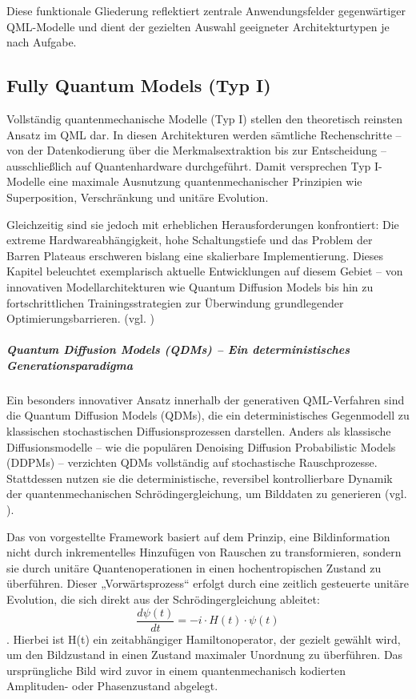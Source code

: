 Diese funktionale Gliederung reflektiert zentrale Anwendungsfelder gegenwärtiger QML-Modelle und dient der gezielten Auswahl geeigneter Architekturtypen je nach Aufgabe.


\subsection{Fully Quantum Models (Typ I)}


Vollständig quantenmechanische Modelle (Typ I) stellen den theoretisch reinsten Ansatz im QML dar. In diesen Architekturen werden sämtliche Rechenschritte – von der Datenkodierung über die Merkmalsextraktion bis zur Entscheidung – ausschließlich auf Quantenhardware durchgeführt. Damit versprechen Typ I-Modelle eine maximale Ausnutzung quantenmechanischer Prinzipien wie Superposition, Verschränkung und unitäre Evolution.

Gleichzeitig sind sie jedoch mit erheblichen Herausforderungen konfrontiert: Die extreme Hardwareabhängigkeit, hohe Schaltungstiefe und das Problem der Barren Plateaus erschweren bislang eine skalierbare Implementierung. Dieses Kapitel beleuchtet exemplarisch aktuelle Entwicklungen auf diesem Gebiet – von innovativen Modellarchitekturen wie Quantum Diffusion Models bis hin zu fortschrittlichen Trainingsstrategien zur Überwindung grundlegender Optimierungsbarrieren. (vgl. \cite{liuQTRLPracticalQuantum2024})

\subparagraph{Quantum Diffusion Models (QDMs) – Ein deterministisches Generationsparadigma}
Ein besonders innovativer Ansatz innerhalb der generativen QML-Verfahren sind die Quantum Diffusion Models (QDMs), die ein deterministisches Gegenmodell zu klassischen stochastischen Diffusionsprozessen darstellen. Anders als klassische Diffusionsmodelle – wie die populären Denoising Diffusion Probabilistic Models (DDPMs) – verzichten QDMs vollständig auf stochastische Rauschprozesse. Stattdessen nutzen sie die deterministische, reversibel kontrollierbare Dynamik der quantenmechanischen Schrödingergleichung, um Bilddaten zu generieren (vgl. \cite{zhangGenerativeQuantumMachine2024}).

Das von \cite{zhangGenerativeQuantumMachine2024} vorgestellte Framework basiert auf dem Prinzip, eine Bildinformation nicht durch inkrementelles Hinzufügen von Rauschen zu transformieren, sondern sie durch unitäre Quantenoperationen in einen hochentropischen Zustand zu überführen. Dieser „Vorwärtsprozess“ erfolgt durch eine zeitlich gesteuerte unitäre Evolution, die sich direkt aus der Schrödingergleichung ableitet:
\[
\frac{d\psi(t)}{dt} = -i \cdot H(t) \cdot \psi(t)
\].
Hierbei ist H(t) ein zeitabhängiger Hamiltonoperator, der gezielt gewählt wird, um den Bildzustand in einen Zustand maximaler Unordnung zu überführen. Das ursprüngliche Bild wird zuvor in einem quantenmechanisch kodierten Amplituden- oder Phasenzustand abgelegt.


